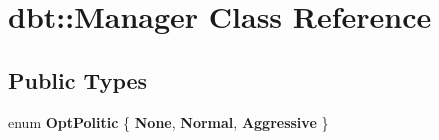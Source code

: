 \hypertarget{classdbt_1_1_manager}{}\section{dbt\+:\+:Manager Class Reference}
\label{classdbt_1_1_manager}
\subsection*{Public Types}
\begin{DoxyCompactItemize}
\item 
enum {\bfseries Opt\+Politic} \{ {\bfseries None}, 
{\bfseries Normal}, 
{\bfseries Aggressive}
 \}\hypertarget{classdbt_1_1_manager_aa2de495fbd2337a0f6514fb81b5b3ca6}{}\label{classdbt_1_1_manager_aa2de495fbd2337a0f6514fb81b5b3ca6}

\end{DoxyCompactItemize}
